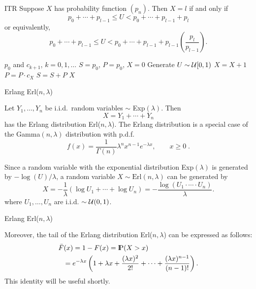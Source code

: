 \documentclass[aspectratio=169]{beamer}
\newcommand{\Prob}{{\rm I\hspace{-0.8mm}P}}
\begin{document}
\begin{frame}{ITR}
Suppose $X$ has probability function $(p_n)$. Then $X=l$ if and only if
\[
p_0 + \cdots + p_{l-1} \le U < p_0 + \cdots + p_{l-1} + p_l
\]
or equivalently,
\[
p_0 + \cdots + p_{l-1} \le U < p_0 + \cdots + p_{l-1} + p_{l-1} \left(\frac{p_l}{p_{l-1}}\right).
\]
\pause
 \begin{algorithm}[H]
\caption{ITR; generating $X\sim (p_k)$}
\label{alg:ITR}
\begin{algorithmic}[1]
\Require $p_0$ and $c_{k+1}$, $k=0,1,\ldots$
\State $S=p_0$, $P=p_0$, $X=0$
 \State Generate $U\sim{\cal U}[0,1)$
  \State  $X=X+1$
   \State $P=P\cdot c_X$
   \State $S=S+P$
   \EndWhile
   \State
\Return $X$
\end{algorithmic}
\end{algorithm}

\end{frame}







\begin{frame}{Erlang Erl($n,\lambda$)}

Let $Y_1, \ldots, Y_n$ be i.i.d.\ random variables $\sim$ Exp$(\lambda)$. Then
$$
X = Y_1 + \cdots + Y_n
$$
has the Erlang distribution Erl($n,\lambda$). The Erlang distribution is a special case of the Gamma$(n,\lambda)$ distribution with p.d.f.
$$
f(x) = \frac{1}{\Gamma(n)} \lambda^n x^{n-1} e^{-\lambda x}, \qquad x \ge 0 \;.
$$

Since a random variable with the exponential distribution Exp$(\lambda)$ is generated by
$-\log(U)/\lambda$, a random variable $X \sim \mathrm{Erl}(n,\lambda)$ can be generated by
$$
X = -\frac{1}{\lambda} (\log U_1 + \cdots + \log U_n) =  -\frac{\log(U_1 \cdot \cdots \cdot U_n)}{\lambda}.
$$
where $U_1, \ldots, U_n$ are i.i.d. $\sim{\cal U}(0,1)$.

\end{frame}




\begin{frame}{Erlang Erl($n,\lambda$)}

Moreover, the tail of the Erlang distribution Erl($n, \lambda$) can be expressed as follows:
\begin{eqnarray}\label{eq:tail_Erlang}
  \lefteqn{\bar{F}(x) = 1 - F(x) = \Prob(X > x)}\nonumber \\
  &&= e^{-\lambda x} \left(1 + \lambda x + \frac{(\lambda x)^2}{2!} + \cdots + \frac{(\lambda x)^{n-1}}{(n-1)!}\right).
\end{eqnarray}
This identity will be useful shortly.
\end{frame}
\end{document}
